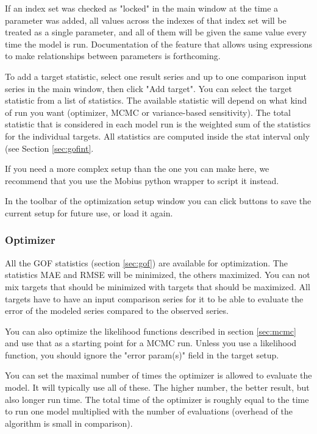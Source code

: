 \documentclass[11pt]{article}
\theoremstyle{definition}
\begin{document}
If an index set was checked as "locked" in the main window at the time a parameter was added, all values across the indexes of that index set will be treated as a single parameter, and all of them will be given the same value every time the model is run. Documentation of the feature that allows using expressions to make relationships between parameters is forthcoming.

To add a target statistic, select one result series and up to one comparison input series in the main window, then click "Add target". You can select the target statistic from a list of statistics. The available statistic will depend on what kind of run you want (optimizer, MCMC or variance-based sensitivity). The total statistic that is considered in each model run is the weighted sum of the statistics for the individual targets. All statistics are computed inside the stat interval only (see Section \ref{sec:gofint}.

If you need a more complex setup than the one you can make here, we recommend that you use the Mobius python wrapper to script it instead.

In the toolbar of the optimization setup window you can click buttons to save the current setup for future use, or load it again.

\subsubsection{Optimizer}
All the GOF statistics (section \ref{sec:gof}) are available for optimization. The statistics MAE and RMSE will be minimized, the others maximized. You can not mix targets that should be minimized with targets that should be maximized. All targets have to have an input comparison series for it to be able to evaluate the error of the modeled series compared to the observed series.

You can also optimize the likelihood functions described in section \ref{sec:mcmc} and use that as a starting point for a MCMC run. Unless you use a likelihood function, you should ignore the "error param(s)" field in the target setup.

You can set the maximal number of times the optimizer is allowed to evaluate the model. It will typically use all of these. The higher number, the better result, but also longer run time. The total time of the optimizer is roughly equal to the time to run one model multiplied with the number of evaluations (overhead of the algorithm is small in comparison).
\end{document}
